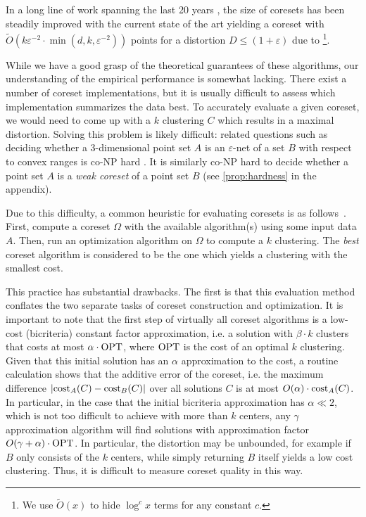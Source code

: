 In a long line of work spanning the last 20 years \cite{BecchettiBC0S19,BravermanJKW21,Chen09,Cohen-AddadSS21,FL11,FeldmanSS20,
HaM04,HaK07,huang2020coresets,BravermanJKW21,LS10,SohlerW18}, the size of coresets has been steadily improved with the current state of the art yielding a coreset with $\tilde{O}(k \varepsilon^{-2} \cdot \min(d,k,\varepsilon^{-2}))$ points for a distortion $D\leq (1+\varepsilon)$ due to \cite{CLSS22}\footnote{We use $\tilde O(x)$ to hide $\log^c x$ terms for any constant $c$.}.

While we have a good grasp of the theoretical guarantees of these algorithms, our understanding of the empirical performance is somewhat lacking. There exist a number of coreset implementations, but it is usually difficult to assess which implementation summarizes the data best. To accurately evaluate a given coreset, we would need to come up with a $k$ clustering $C$ which results in a maximal distortion. Solving this problem is likely difficult: related questions such as deciding whether a 3-dimensional point set $A$ is an $\varepsilon$-net of a set $B$ with respect to convex ranges is co-NP hard \cite{GiannopoulosKWW12}. It is similarly co-NP hard to decide whether a point set $A$ is a \emph{weak coreset} of a point set $B$ (see \cref{prop:hardness} in the appendix). 

Due to this difficulty, a common heuristic for evaluating coresets is as follows~\cite{AckermannMRSLS12,FGSSS13}. First, compute a coreset $\Omega$ with the available algorithm(s) using some input data $A$. Then, run an optimization algorithm on $\Omega$ to compute a $k$ clustering. The \emph{best} coreset algorithm is considered to be the one which yields a clustering with the smallest cost.

This practice has substantial drawbacks.
The first is that this evaluation method conflates the two separate tasks of coreset construction and optimization.
It is important to note that the first step of virtually all coreset algorithms is a low-cost (bicriteria) constant factor approximation, i.e. a solution with $\beta\cdot k$ clusters that costs at most $\alpha\cdot \text{OPT}$, where $\text{OPT}$ is the cost of an optimal $k$ clustering.
Given that this initial solution has an $\alpha$ approximation to the cost, a routine calculation shows that the additive error of the coreset, i.e. the maximum difference
$ \left\vert \text{cost}_A(C) - \text{cost}_B(C) \right\vert $
over all solutions $C$ is at most $O(\alpha)\cdot \text{cost}_A(C)$. 
In particular, in the case that the initial bicriteria approximation has $\alpha \ll 2$, which is not too difficult to achieve with more than $k$ centers, any $\gamma$ approximation algorithm will find solutions with approximation factor $O(\gamma + \alpha) \cdot\text{OPT}$. In particular, the distortion may be unbounded, for example if $B$ only consists of the $k$ centers, while simply returning $B$ itself yields a low cost clustering. Thus, it is difficult to measure coreset quality in this way.

